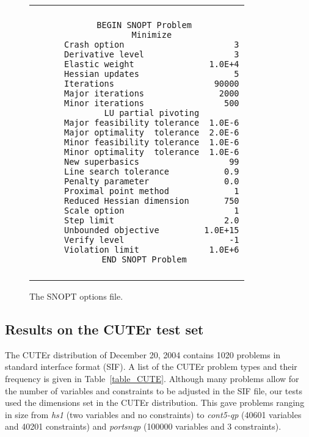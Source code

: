 \documentclass[draft,leqno,onefignum,onetabnum]{siamltex}
\def\CUTEr {{\small CUTEr}}
\def\Cute#1{\hbox{\it\lowercase{#1}\/}}
\begin{document}
\begin{figure}[tb]  \scriptsize %
\begin{center}
\begin{tabular}{|c|}
\hline
\\[0pt]
\begin{minipage}{4.0in}
\begin{verbatim}
   BEGIN SNOPT Problem
      Minimize
      Crash option                      3
      Derivative level                  3
      Elastic weight               1.0E+4
      Hessian updates                   5
      Iterations                    90000
      Major iterations               2000
      Minor iterations                500
      LU partial pivoting
      Major feasibility tolerance  1.0E-6
      Major optimality  tolerance  2.0E-6
      Minor feasibility tolerance  1.0E-6
      Minor optimality  tolerance  1.0E-6
      New superbasics                  99
      Line search tolerance           0.9
      Penalty parameter               0.0
      Proximal point method             1
      Reduced Hessian dimension       750
      Scale option                      1
      Step limit                      2.0
      Unbounded objective         1.0E+15
      Verify level                     -1
      Violation limit              1.0E+6
   END SNOPT Problem
\end{verbatim}
\end{minipage}
\\[0pt]
\\ \hline
\end{tabular}
\end{center}
\caption{The SNOPT options file.}
\label{fig-optionsS}
\end{figure}


 \subsection{Results on the CUTEr test set}  \label{sec-cute-results}

  The \CUTEr{} distribution of December 20, 2004 contains 1020 problems in
standard interface format (SIF)\@.  A list of the \CUTEr{} problem types
and their frequency is given in Table~\ref{table_CUTE}.  Although many
problems allow for the number of variables and constraints to be
adjusted in the SIF file, our tests used the dimensions set in the
\CUTEr{} distribution. This gave problems ranging in size from
\Cute{HS1} (two variables and no constraints) to
\Cute{CONT5-QP} (40601 variables and 40201 constraints)
and \Cute{PORTSNQP} (100000 variables and 3 constraints).
\end{document}
